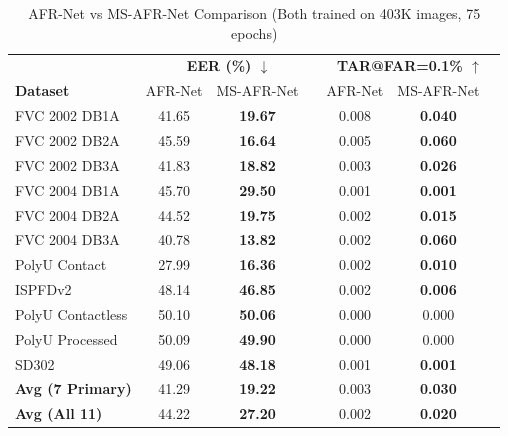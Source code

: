 \documentclass[conference]{IEEEtran}
\begin{document}
\begin{table}[t]
\centering
\caption{AFR-Net vs MS-AFR-Net Comparison (Both trained on 403K images, 75 epochs)}
\begin{tabular}{l|ccc|ccc}
\toprule
& \multicolumn{3}{c|}{\textbf{EER (\%) $\downarrow$}} & \multicolumn{3}{c}{\textbf{TAR@FAR=0.1\% $\uparrow$}} \\
\textbf{Dataset} & AFR-Net & MS-AFR-Net & & AFR-Net & MS-AFR-Net & \\
\midrule
FVC 2002 DB1A & 41.65 & \textbf{19.67} & & 0.008 & \textbf{0.040} & \\
FVC 2002 DB2A & 45.59 & \textbf{16.64} & & 0.005 & \textbf{0.060} & \\
FVC 2002 DB3A & 41.83 & \textbf{18.82} & & 0.003 & \textbf{0.026} & \\
FVC 2004 DB1A & 45.70 & \textbf{29.50} & & 0.001 & \textbf{0.001} & \\
FVC 2004 DB2A & 44.52 & \textbf{19.75} & & 0.002 & \textbf{0.015} & \\
FVC 2004 DB3A & 40.78 & \textbf{13.82} & & 0.002 & \textbf{0.060} & \\
PolyU Contact & 27.99 & \textbf{16.36} & & 0.002 & \textbf{0.010} & \\
\midrule
ISPFDv2 & 48.14 & \textbf{46.85} & & 0.002 & \textbf{0.006} & \\
PolyU Contactless & 50.10 & \textbf{50.06} & & 0.000 & 0.000 & \\
PolyU Processed & 50.09 & \textbf{49.90} & & 0.000 & 0.000 & \\
SD302 & 49.06 & \textbf{48.18} & & 0.001 & \textbf{0.001} & \\
\midrule
\textbf{Avg (7 Primary)} & 41.29 & \textbf{19.22} & & 0.003 & \textbf{0.030} & \\
\textbf{Avg (All 11)} & 44.22 & \textbf{27.20} & & 0.002 & \textbf{0.020} & \\
\bottomrule
\end{tabular}
\label{tab:results-eer}
\end{table}
\end{document}
